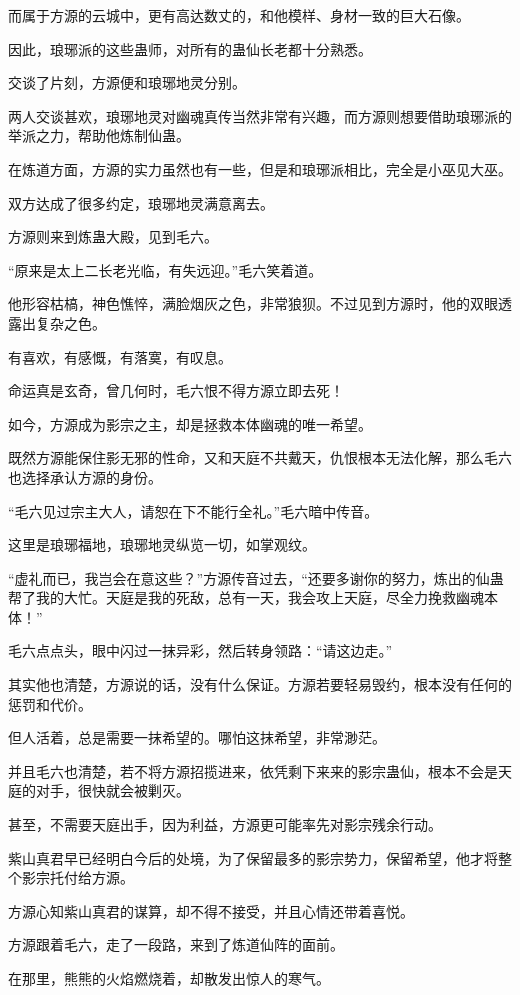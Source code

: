 \begin{this_body}
而属于方源的云城中，更有高达数丈的，和他模样、身材一致的巨大石像。

因此，琅琊派的这些蛊师，对所有的蛊仙长老都十分熟悉。

交谈了片刻，方源便和琅琊地灵分别。

两人交谈甚欢，琅琊地灵对幽魂真传当然非常有兴趣，而方源则想要借助琅琊派的举派之力，帮助他炼制仙蛊。

在炼道方面，方源的实力虽然也有一些，但是和琅琊派相比，完全是小巫见大巫。

双方达成了很多约定，琅琊地灵满意离去。

方源则来到炼蛊大殿，见到毛六。

“原来是太上二长老光临，有失远迎。”毛六笑着道。

他形容枯槁，神色憔悴，满脸烟灰之色，非常狼狈。不过见到方源时，他的双眼透露出复杂之色。

有喜欢，有感慨，有落寞，有叹息。

命运真是玄奇，曾几何时，毛六恨不得方源立即去死！

如今，方源成为影宗之主，却是拯救本体幽魂的唯一希望。

既然方源能保住影无邪的性命，又和天庭不共戴天，仇恨根本无法化解，那么毛六也选择承认方源的身份。

“毛六见过宗主大人，请恕在下不能行全礼。”毛六暗中传音。

这里是琅琊福地，琅琊地灵纵览一切，如掌观纹。

“虚礼而已，我岂会在意这些？”方源传音过去，“还要多谢你的努力，炼出的仙蛊帮了我的大忙。天庭是我的死敌，总有一天，我会攻上天庭，尽全力挽救幽魂本体！”

毛六点点头，眼中闪过一抹异彩，然后转身领路：“请这边走。”

其实他也清楚，方源说的话，没有什么保证。方源若要轻易毁约，根本没有任何的惩罚和代价。

但人活着，总是需要一抹希望的。哪怕这抹希望，非常渺茫。

并且毛六也清楚，若不将方源招揽进来，依凭剩下来来的影宗蛊仙，根本不会是天庭的对手，很快就会被剿灭。

甚至，不需要天庭出手，因为利益，方源更可能率先对影宗残余行动。

紫山真君早已经明白今后的处境，为了保留最多的影宗势力，保留希望，他才将整个影宗托付给方源。

方源心知紫山真君的谋算，却不得不接受，并且心情还带着喜悦。

方源跟着毛六，走了一段路，来到了炼道仙阵的面前。

在那里，熊熊的火焰燃烧着，却散发出惊人的寒气。


\end{this_body}
